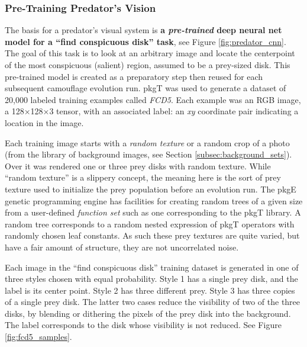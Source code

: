 \documentclass[acmtog]{acmart}
\newcommand{\jargon}[1]{\textit{#1}}
\newcommand{\texsyn}[0]{pkgT}
\newcommand{\lazypredator}[0]{pkgE}
\begin{document}
\subsubsection{Pre-Training Predator's Vision}
The basis for a predator's visual system is \textbf{a \jargon{pre-trained} deep neural net model for a “find conspicuous disk” task}, see Figure \ref{fig:predator_cnn}. The goal of this task is to look at an arbitrary image and locate the centerpoint of the most conspicuous (salient) region, assumed to be a prey-sized disk. This pre-trained model is created as a preparatory step then reused for each subsequent camouflage evolution run. \texsyn{} was used to generate a dataset of 20,000 labeled training examples called \jargon{FCD5}. Each example was an RGB image, a 128×128×3 tensor, with an associated label: an \textit{xy} coordinate pair indicating a location in the image.
\par
Each training image starts with a \jargon{random texture} or a random crop of a photo (from the library of background images, see Section \ref{subsec:background_sets}). Over it was rendered one or three prey disks with random texture. While “random texture” is a slippery concept, the meaning here is the sort of prey texture used to initialize the prey population before an evolution run. The \lazypredator{} genetic programming engine has facilities for creating random trees of a given size from a user-defined \jargon{function set} such as one corresponding to the \texsyn{} library. A random tree corresponds to a random nested expression of \texsyn{} operators with randomly chosen leaf constants. As such these prey textures are quite varied, but have a fair amount of structure, they are not uncorrelated noise.
\par
Each image in the “find conspicuous disk” training dataset is generated in one of three styles chosen with equal probability. Style 1 has a single prey disk, and the label is its center point. Style 2 has three different prey. Style 3 has three copies of a single prey disk. The latter two cases reduce the visibility of two of the three disks, by blending or dithering the pixels of the prey disk into the background. The label corresponds to the disk whose visibility is not reduced. See Figure \ref{fig:fcd5_samples}.
\par
\end{document}
